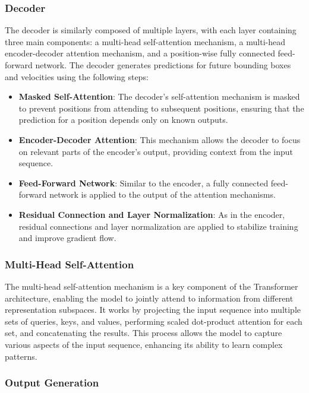 \documentclass[12pt,oneside]{book} %
\begin{document}
\subsubsection{Decoder}

The decoder is similarly composed of multiple layers, with each layer
containing three main components: a multi-head self-attention mechanism, a
multi-head encoder-decoder attention mechanism, and a position-wise fully
connected feed-forward network. The decoder generates predictions for future
bounding boxes and velocities using the following steps:

\begin{itemize}
    \item \textbf{Masked Self-Attention}: The decoder's self-attention mechanism is masked to prevent positions from attending to subsequent positions, ensuring that the prediction for a position depends only on known outputs.
    \item \textbf{Encoder-Decoder Attention}: This mechanism allows the decoder to focus on relevant parts of the encoder's output, providing context from the input sequence.
    \item \textbf{Feed-Forward Network}: Similar to the encoder, a fully connected feed-forward network is applied to the output of the attention mechanisms.
    \item \textbf{Residual Connection and Layer Normalization}: As in the encoder, residual connections and layer normalization are applied to stabilize training and improve gradient flow.
\end{itemize}

\subsubsection{Multi-Head Self-Attention}

The multi-head self-attention mechanism is a key component of the Transformer
architecture, enabling the model to jointly attend to information from
different representation subspaces. It works by projecting the input sequence
into multiple sets of queries, keys, and values, performing scaled dot-product
attention for each set, and concatenating the results. This process allows the
model to capture various aspects of the input sequence, enhancing its ability
to learn complex patterns.

\subsubsection{Output Generation}
\end{document}

